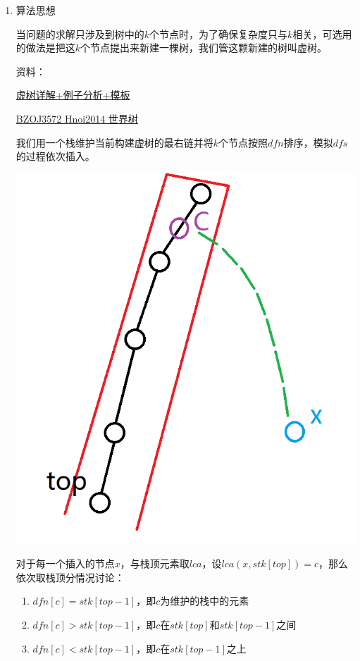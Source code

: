 \documentclass[11pt]{article}
\begin{document}
\begin{enumerate}
\item 算法思想
\label{sec-2-2-4-1}


当问题的求解只涉及到树中的\(k\)个节点时，为了确保复杂度只与\(k\)相关，可选用的做法是把这\(k\)个节点提出来新建一棵树，我们管这颗新建的树叫虚树。

资料：

\href{https://www.cnblogs.com/chenhuan001/p/5639482.html}{虚树详解+例子分析+模板}

\href{http://lazycal.logdown.com/posts/202331-bzoj3572}{BZOJ3572 Hnoi2014 世界树}

我们用一个栈维护当前构建虚树的最右链并将\(k\)个节点按照\(dfn\)排序，模拟\(dfs\)的过程依次插入。

\includegraphics[width=.9\linewidth]{./Source/Picture/virtualtree.png}

对于每一个插入的节点\(x\)，与栈顶元素取\(lca\)，设\(lca(x,stk[top])=c\)，那么依次取栈顶分情况讨论：

\begin{enumerate}
\item \(dfn[c]=stk[top-1]\)，即\(c\)为维护的栈中的元素
\item \(dfn[c]>stk[top-1]\)，即\(c\)在\(stk[top]\)和\(stk[top-1]\)之间
\item \(dfn[c]<stk[top-1]\)，即\(c\)在\(stk[top-1]\)之上
\end{enumerate}


\end{enumerate}
\end{document}
